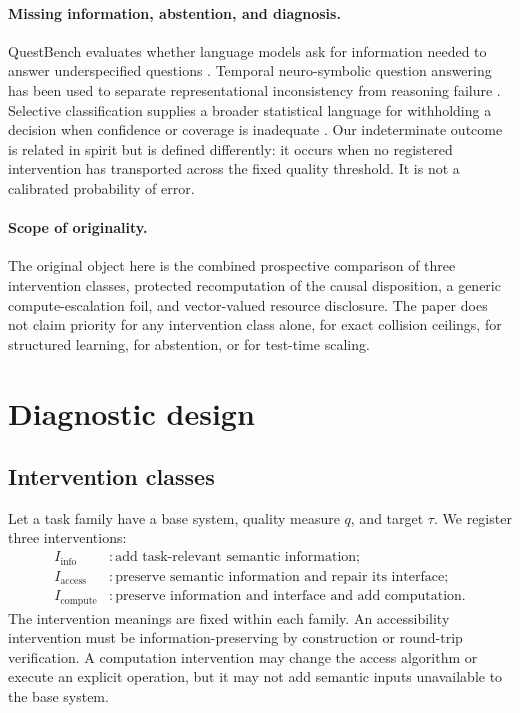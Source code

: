 \documentclass[10pt]{article}
\begin{document}
\paragraph{Missing information, abstention, and diagnosis.}
QuestBench evaluates whether language models ask for information needed to answer underspecified questions \citep{li2025questbench}. Temporal neuro-symbolic question answering has been used to separate representational inconsistency from reasoning failure \citep{liem2026temporal}. Selective classification supplies a broader statistical language for withholding a decision when confidence or coverage is inadequate \citep{geifman2017selective}. Our indeterminate outcome is related in spirit but is defined differently: it occurs when no registered intervention has transported across the fixed quality threshold. It is not a calibrated probability of error.

\paragraph{Scope of originality.}
The original object here is the combined prospective comparison of three intervention classes, protected recomputation of the causal disposition, a generic compute-escalation foil, and vector-valued resource disclosure. The paper does not claim priority for any intervention class alone, for exact collision ceilings, for structured learning, for abstention, or for test-time scaling.

\section{Diagnostic design}

\subsection{Intervention classes}

Let a task family have a base system, quality measure $q$, and target $\tau$. We register three interventions:
\begin{align*}
I_{\mathrm{info}} &: \text{add task-relevant semantic information};\\
I_{\mathrm{access}} &: \text{preserve semantic information and repair its interface};\\
I_{\mathrm{compute}} &: \text{preserve information and interface and add computation}.
\end{align*}
The intervention meanings are fixed within each family. An accessibility intervention must be information-preserving by construction or round-trip verification. A computation intervention may change the access algorithm or execute an explicit operation, but it may not add semantic inputs unavailable to the base system.
\end{document}
